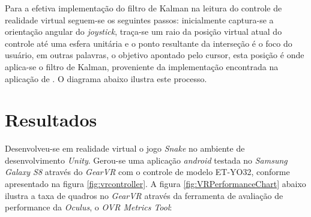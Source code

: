 \documentclass[conference]{IEEEtran}
\begin{document}
Para a efetiva implementação do filtro de Kalman na leitura do controle de realidade virtual seguem-se os seguintes passos: inicialmente captura-se a orientação angular do \textit{joystick}, traça-se um raio da posição virtual atual do controle até uma esfera unitária e o ponto resultante da interseção é o foco do usuário, em outras palavras, o objetivo apontado pelo cursor, esta posição é onde aplica-se o filtro de Kalman, proveniente da implementação encontrada na aplicação de \cite{KalmanComponent}. O diagrama abaixo ilustra este processo.





\section{Resultados} \label{sec:results}
Desenvolveu-se em realidade virtual o jogo \textit{Snake} no ambiente de desenvolvimento \textit{Unity}. Gerou-se uma aplicação \textit{android} testada no \textit{Samsung Galaxy S8} através do \textit{GearVR} com o controle de modelo ET-YO32, conforme apresentado na figura \ref{fig:vrcontroller}. A figura \ref{fig:VRPerformanceChart} abaixo ilustra a taxa de quadros no \textit{GearVR} através da ferramenta de avaliação de performance da \textit{Oculus}, o \textit{OVR Metrics Tool}:
\end{document}

